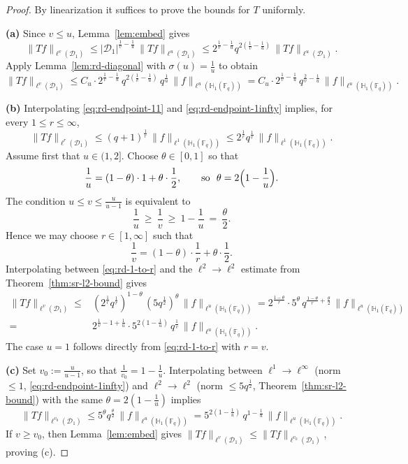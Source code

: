 \documentclass[11pt]{article}
\newcommand{\1}{\mathbf 1}
\begin{document}
\begin{proof}
By linearization it suffices to prove the bounds for $T$ uniformly.


\smallskip
\noindent\textbf{(a)}
Since $v\le u$, Lemma~\ref{lem:embed} gives
\[
\|Tf\|_{\ell^v(\mathcal D_1)}
\le
|\mathcal D_1|^{\frac{1}{v}-\frac{1}{u}}\,
\|Tf\|_{\ell^u(\mathcal D_1)}
\leq 2^{\frac{1}{v}-\frac{1}{u}}
q^{2(\frac{1}{v}-\frac{1}{u})}\,\|Tf\|_{\ell^u(\mathcal D_1)}.
\]
Apply Lemma~\ref{lem:rd-diagonal} with $\sigma(u)=\frac{1}{u}$ to obtain
\[
\|Tf\|_{\ell^v(\mathcal D_1)}
\leq C_u \cdot  2^{\frac{1}{v}-\frac{1}{u}} \, 
q^{2(\frac{1}{v}-\frac{1}{u})}\,q^{\frac{1}{u}}\,\|f\|_{\ell^u(\mathbb H_1(\mathbb F_q))}
=C_u \cdot  2^{\frac{1}{v}-\frac{1}{u}} \,
q^{\frac{2}{v}-\frac{1}{u}}\,\|f\|_{\ell^u(\mathbb H_1(\mathbb F_q))}.
\]

\smallskip
\noindent\textbf{(b)}
Interpolating \eqref{eq:rd-endpoint-11} and \eqref{eq:rd-endpoint-1infty} implies, for every $1\le r\le\infty$,
\begin{equation}\label{eq:rd-1-to-r}
\|Tf\|_{\ell^r(\mathcal D_1)}\le (q+1)^{\frac{1}{r}}\,\|f\|_{\ell^1(\mathbb H_1(\mathbb F_q))}\leq 2^{\frac{1}{r}}  q^{\frac{1}{r}}\,\|f\|_{\ell^1(\mathbb H_1(\mathbb F_q))}.
\end{equation}
Assume first that $u\in(1,2]$.
Choose $\theta\in[0,1]$ so that
\[
\frac{1}{u}=(1-\theta)\cdot 1+\theta\cdot\frac{1}{2},
\qquad\text{so }\ \theta=2\Bigl(1-\frac{1}{u}\Bigr).
\]
The condition $u\le v\le \frac{u}{u-1}$ is equivalent to
\[
\frac{1}{u}\ \ge\ \frac{1}{v}\ \ge\ 1-\frac{1}{u}\ =\ \frac{\theta}{2}.
\]
Hence we may choose $r\in[1,\infty]$ such that
\[
\frac{1}{v}=(1-\theta)\cdot\frac{1}{r}+\theta\cdot\frac{1}{2}.
\]
Interpolating between \eqref{eq:rd-1-to-r} and the $\ell^2\to\ell^2$ estimate from
Theorem~\ref{thm:sr-l2-bound} gives
\begin{align*}
    \|Tf\|_{\ell^v(\mathcal D_1)} \leq & 
(2^{\frac{1}{r}} q^{\frac{1}{r}})^{1-\theta}\,(5 q^{\frac{1}{2}})^\theta\,\|f\|_{\ell^u(\mathbb H_1(\mathbb F_q))}
=2^{\frac{1-\theta}{r}} \cdot 5^{\theta} \,
q^{\frac{1-\theta}{r}+\frac{\theta}{2}}\,\|f\|_{\ell^u(\mathbb H_1(\mathbb F_q))} \\
=& 2^{\frac{1}{v}-1+\frac{1}{u}} \cdot 5^{2(1-\frac{1}{u})} \,
q^{\frac{1}{v}}\,\|f\|_{\ell^u(\mathbb H_1(\mathbb F_q))}.
\end{align*}
The case $u=1$ follows directly from \eqref{eq:rd-1-to-r} with $r=v$.

\smallskip
\noindent\textbf{(c)}
Set $v_0:=\frac{u}{u-1}$, so that $\frac{1}{v_0}=1-\frac{1}{u}$.
Interpolating between $\ell^1\to\ell^\infty$ (norm $\le 1$, \eqref{eq:rd-endpoint-1infty})
and $\ell^2\to\ell^2$ (norm $\leq 5 q^{\frac{1}{2}}$, Theorem~\ref{thm:sr-l2-bound}) with the same
$\theta=2(1-\frac{1}{u})$ implies
\[
\|Tf\|_{\ell^{v_0}(\mathcal D_1)}\leq 5^{\theta} q^{\frac{\theta}{2}}\,\|f\|_{\ell^u(\mathbb H_1(\mathbb F_q))}=5^{2(1-\frac{1}{u})} \, q^{1-\frac{1}{u}}\,\|f\|_{\ell^u(\mathbb H_1(\mathbb F_q))}.
\]
If $v\ge v_0$, then Lemma~\ref{lem:embed} gives
$\|Tf\|_{\ell^v(\mathcal D_1)}\le \|Tf\|_{\ell^{v_0}(\mathcal D_1)}$, proving (c).
\end{proof}
\end{document}
